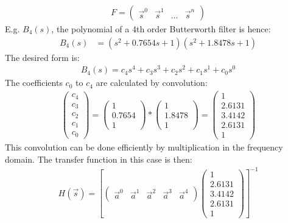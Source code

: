 \documentclass[pdftex,a4paper,parskip,listof=totoc,bibliography=totoc,onehalfspacing,12pt]{scrreprt}
\begin{document}
\begin{align*}
 F = \begin{pmatrix}
      \vec{s}^0 & \vec{s}^1 & \dots & \vec{s}^n
     \end{pmatrix}
\end{align*}
E.g. $B_4(s)$, the polynomial of a 4th order Butterworth filter is hence:
\begin{align*}
  B_4(s) &= (s^2+0.7654s+1)(s^2+1.8478s+1)
\end{align*}
The desired form is:
\begin{align*}
 B_4(s) = c_4 s^4 + c_3 s^3 + c_2 s^2 +c_1 s^1 +c_0 s^0
\end{align*}
The coefficients $c_0$ to $c_4$ are calculated by convolution:
\begin{align*}
\begin{pmatrix} c_4 \\ c_3 \\ c_2 \\ c_1 \\ c_0 \end{pmatrix}  = \begin{pmatrix}1 \\ 0.7654 \\ 1 \end{pmatrix} * \begin{pmatrix}1 \\ 1.8478 \\ 1\end{pmatrix} = \begin{pmatrix} 1 \\ 2.6131 \\ 3.4142 \\ 2.6131 \\ 1 \end{pmatrix}
\end{align*}
This convolution can be done efficiently by multiplication in the frequency domain. The transfer function in this case is then:
\begin{align*}
 H(\vec{s}) = \left[ \begin{pmatrix} \vec{a}^0 & \vec{a}^1 &  \vec{a}^2 &  \vec{a}^3 & \vec{a}^4 \end{pmatrix} \begin{pmatrix} 1 \\ 2.6131 \\ 3.4142 \\ 2.6131 \\ 1 \end{pmatrix} \right]^{-1}
\end{align*}
\end{document}
